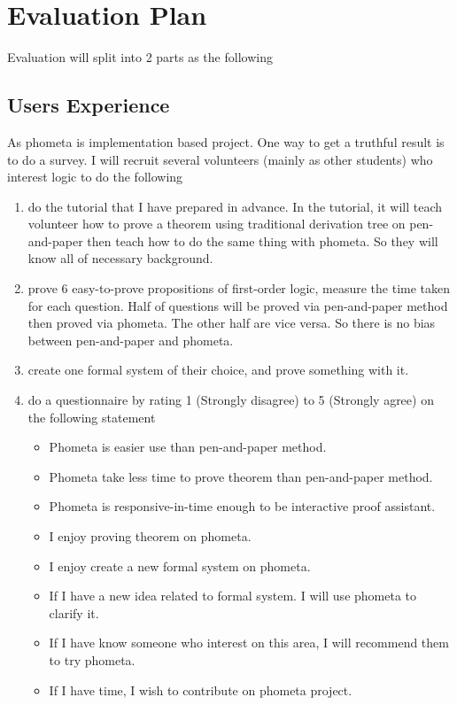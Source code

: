 

\chapter{Evaluation Plan}

Evaluation will split into 2 parts as the following

\section{Users Experience}

As phometa is implementation based project. One way to get a truthful result is to do a survey. I will recruit several volunteers (mainly as other students) who interest logic to do the following

\begin{enumerate}
    \item do the tutorial that I have prepared in advance. In the tutorial, it will teach volunteer how to prove a theorem using traditional derivation tree on pen-and-paper then teach how to do the same thing with phometa. So they will know all of necessary background.
    \item prove 6 easy-to-prove propositions of first-order logic, measure the time taken for each question. Half of questions will be proved via pen-and-paper method then proved via phometa. The other half are vice versa. So there is no bias between pen-and-paper and phometa.
    \item create one formal system of their choice, and prove something with it.
    \item do a questionnaire by rating 1 (Strongly disagree) to 5 (Strongly agree) on the following statement
    \begin{itemize}
         \item Phometa is easier use than pen-and-paper method.
         \item Phometa take less time to prove theorem than pen-and-paper method.
         \item Phometa is responsive-in-time enough to be interactive proof assistant.
         \item I enjoy proving theorem on phometa.
         \item I enjoy create a new formal system on phometa.
         \item If I have a new idea related to formal system. I will use phometa to clarify it.
         \item If I have know someone who interest on this area, I will recommend them to try phometa.
         \item If I have time, I wish to contribute on phometa project.
    \end{itemize}
\end{enumerate}

